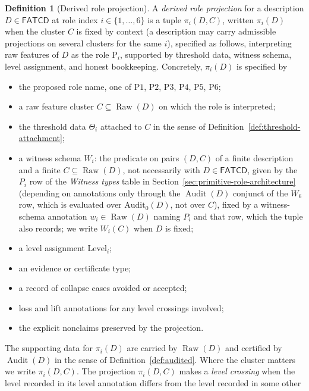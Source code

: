\documentclass[11pt]{article}
\theoremstyle{definition}
\newtheorem{definition}[theorem]{Definition}
\newcommand{\FATCD}{\ensuremath{\mathsf{FATCD}}}
\newcommand{\Raw}[1]{\ensuremath{\operatorname{Raw}\!\left(#1\right)}}
\newcommand{\Audit}[1]{\ensuremath{\operatorname{Audit}\!\left(#1\right)}}
\newcommand{\Pone}{\ensuremath{\mathrm{P1}}}
\newcommand{\Ptwo}{\ensuremath{\mathrm{P2}}}
\newcommand{\Pthree}{\ensuremath{\mathrm{P3}}}
\newcommand{\Pfour}{\ensuremath{\mathrm{P4}}}
\newcommand{\Pfive}{\ensuremath{\mathrm{P5}}}
\newcommand{\Psix}{\ensuremath{\mathrm{P6}}}
\begin{document}
\begin{definition}[Derived role projection]\label{def:role-projection}
A \emph{derived role projection} for a description \(D \in \FATCD{}\) at
role index \(i \in \{1,\ldots,6\}\) is a tuple \(\pi_i(D,C)\), written \(\pi_i(D)\) when the cluster \(C\) is fixed
by context (a description may carry admissible projections on several clusters
for the same \(i\)), specified as follows, interpreting raw features of \(D\) as the role \(\mathrm{P}_i\), supported
by threshold data, witness schema, level assignment, and honest bookkeeping.
Concretely, \(\pi_i(D)\) is specified by
\begin{itemize}[topsep=2pt,itemsep=1pt]
  \item the proposed role name, one of \Pone{}, \Ptwo{}, \Pthree{},
    \Pfour{}, \Pfive{}, \Psix{};
  \item a raw feature cluster \(C \subseteq \Raw{D}\) on which the role is
    interpreted;
  \item the threshold data \(\Theta_i\) attached to \(C\) in the sense of
    Definition~\ref{def:threshold-attachment};
  \item a witness schema \(W_i\): the predicate on pairs \((D,C)\) of a finite
    description and a finite \(C\subseteq\Raw{D}\), not necessarily with
    \(D\in\FATCD{}\), given by the \(P_i\) row of the
    \emph{Witness types} table in Section~\ref{sec:primitive-role-architecture}
    (depending on annotations only through the \(\Audit{D}\) conjunct of the
    \(W_6\) row, which is evaluated over \(\mathrm{Audit}_0(D)\), not over \(C\)),
    fixed by a witness-schema annotation \(w_i\in\Raw{D}\) naming \(P_i\) and
    that row, which the tuple also records; we write \(W_i(C)\) when \(D\) is
    fixed;
  \item a level assignment \(\mathrm{Level}_i\);
  \item an evidence or certificate type;
  \item a record of collapse cases avoided or accepted;
  \item loss and lift annotations for any level crossings involved;
  \item the explicit nonclaims preserved by the projection.
\end{itemize}
The supporting data for \(\pi_i(D)\) are carried by
\(\Raw{D}\) and certified by \(\Audit{D}\) in the sense of
Definition~\ref{def:audited}. Where the cluster matters we write
\(\pi_i(D,C)\). The projection \(\pi_i(D,C)\) makes a \emph{level crossing} when the level
recorded in its level annotation differs from the level recorded in some other

\end{definition}
\end{document}
